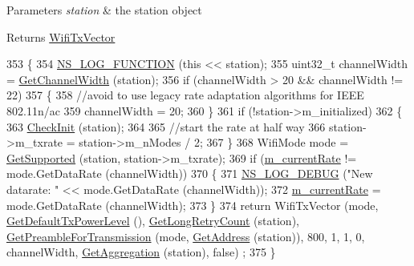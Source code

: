 \begin{DoxyParams}{Parameters}
{\em station} & the station object \\
\hline
\end{DoxyParams}
\begin{DoxyReturn}{Returns}
\hyperlink{classns3_1_1WifiTxVector}{Wifi\+Tx\+Vector} 
\end{DoxyReturn}

\begin{DoxyCode}
353 \{
354   \hyperlink{log-macros-disabled_8h_a90b90d5bad1f39cb1b64923ea94c0761}{NS\_LOG\_FUNCTION} (\textcolor{keyword}{this} << station);
355   uint32\_t channelWidth = \hyperlink{classns3_1_1WifiRemoteStationManager_a918213c5b9fa629c4986f6d90521bbd4}{GetChannelWidth} (station);
356   \textcolor{keywordflow}{if} (channelWidth > 20 && channelWidth != 22)
357     \{
358       \textcolor{comment}{//avoid to use legacy rate adaptation algorithms for IEEE 802.11n/ac}
359       channelWidth = 20;
360     \}
361   \textcolor{keywordflow}{if} (!station->m\_initialized)
362     \{
363       \hyperlink{classns3_1_1MinstrelWifiManager_a5768fc5c0a32ee601e476d51b7cd8eec}{CheckInit} (station);
364 
365       \textcolor{comment}{//start the rate at half way}
366       station->m\_txrate = station->m\_nModes / 2;
367     \}
368   WifiMode mode = \hyperlink{classns3_1_1WifiRemoteStationManager_a995c8bae0d84b168fd3e8bc9ecaacdd4}{GetSupported} (station, station->m\_txrate);
369   \textcolor{keywordflow}{if} (\hyperlink{classns3_1_1MinstrelWifiManager_aba1b46b41de3b8b0b4279d0c5adad57e}{m\_currentRate} != mode.GetDataRate (channelWidth))
370     \{
371       \hyperlink{group__logging_ga413f1886406d49f59a6a0a89b77b4d0a}{NS\_LOG\_DEBUG} (\textcolor{stringliteral}{"New datarate: "} << mode.GetDataRate (channelWidth));
372       \hyperlink{classns3_1_1MinstrelWifiManager_aba1b46b41de3b8b0b4279d0c5adad57e}{m\_currentRate} = mode.GetDataRate (channelWidth);
373     \}
374   \textcolor{keywordflow}{return} WifiTxVector (mode, \hyperlink{classns3_1_1WifiRemoteStationManager_acff2fc859ee6b4c66ea7a83dd075b5d6}{GetDefaultTxPowerLevel} (), 
      \hyperlink{classns3_1_1WifiRemoteStationManager_aac10b1403fb0bd670f8a8bd6d7e48304}{GetLongRetryCount} (station), \hyperlink{classns3_1_1WifiRemoteStationManager_a0f44967cbd7488baada4802ebc642110}{GetPreambleForTransmission} (mode, 
      \hyperlink{classns3_1_1WifiRemoteStationManager_ac9ccc8c514bd8d2af05c290e63461a2a}{GetAddress} (station)), 800, 1, 1, 0, channelWidth, \hyperlink{classns3_1_1WifiRemoteStationManager_a5421c8d510cb16eebeac9f2ea9dd73c3}{GetAggregation} (station), \textcolor{keyword}{false})
      ;
375 \}
\end{DoxyCode}


